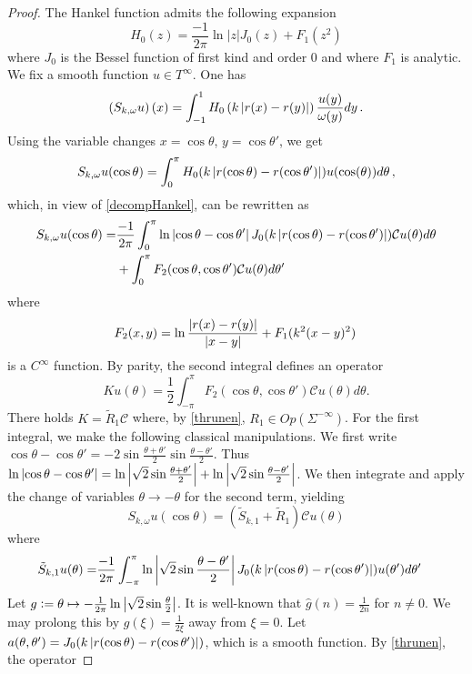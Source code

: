 \documentclass[a4paper]{article}
\begin{document}
\begin{proof}
	The Hankel function admits the following expansion
	\begin{equation}
	\label{decompHankel}
	H_0(z) = \frac{-1}{2\pi}\ln|z| J_0(z) + F_1(z^2)
	\end{equation}
	where $J_0$ is the Bessel function of first kind and order $0$ and where $F_1$ is analytic. We fix a smooth function $u \in T^{\infty}$. One has
	\[\left(S_{k,\omega} u\right)(x) = \int_{-1}^1 H_0\left(k\left\lvert r(x) - r(y) \right\rvert\right)\frac{u(y)}{\omega(y)}dy\,.\]
	Using the variable changes $x = \cos\theta$, $y = \cos \theta'$, we get 
	\[ S_{k,\omega} u(\cos \theta) = \int_{0}^\pi H_0(k \left\lvert r(\cos \theta) - r(\cos \theta') \right\rvert) u(\cos(\theta)) d\theta\,,\]
	which, in view of \eqref{decompHankel}, can be rewritten as
	\[\begin{split}
	S_{k,\omega} u(\cos \theta) = &\frac{-1}{2\pi}\int_{0}^\pi \ln \left\lvert \cos \theta - \cos \theta' \right\rvert J_0(k \left\lvert r(\cos \theta) - r(\cos \theta') \right\rvert)\mathcal{C}u(\theta) d\theta \\
	&+ \int_{0}^\pi F_2(\cos\theta,\cos\theta') \mathcal{C}u(\theta) d\theta'
	\end{split}\]
	where 
	\[F_2(x,y) = \ln \frac{\left\lvert r(x)-r(y) \right\rvert}{\left\lvert x-y \right\rvert} + F_1(k^2(x - y)^2)\,\]
	is a $C^\infty$ function. 
	By parity, the second integral defines an operator 
	\[Ku(\theta) = \frac{1}{2} \int_{-\pi}^{\pi} F_2(\cos\theta,\cos\theta') \mathcal{C}u(\theta) d\theta.\]
	There holds $K = \tilde{R}_1\mathcal{C}$ where, by \autoref{thrunen}, $R_1 \in \textit{Op}(\Sigma^{-\infty})$. For the first integral, we make the following classical manipulations. We first write $\cos \theta - \cos\theta' = - 2 \sin \frac{\theta + \theta'}{2}\sin \frac{\theta - \theta'}{2}$. Thus $\ln\left\lvert \cos \theta - \cos\theta' \right\rvert= \ln \left\lvert \sqrt{2} \sin \frac{\theta + \theta'}{2} \right\rvert + \ln \left\lvert \sqrt{2}\sin \frac{\theta - \theta'}{2} \right\rvert$. We then integrate and apply the change of variables $\theta \to - \theta$ for the second term, yielding
	\[S_{k,\omega}u(\cos\theta) = \left(\tilde{S}_{k,1} + \tilde{R}_1 \right)\mathcal{C}u(\theta)\]
	where
	\[\begin{split}
	\tilde{S}_{k,1}u(\theta) = &\frac{-1}{2\pi} \int_{-\pi}^\pi \ln \left\lvert \sqrt{2} \sin \frac{\theta - \theta'}{2} \right\rvert J_0(k\left\lvert r(\cos\theta) - r(\cos \theta') \right\rvert)u(\theta')d\theta'
	\end{split}\]
	Let $g \mathrel{\mathop:}= \theta \mapsto -\frac{1}{2\pi}\ln \left\lvert \sqrt{2} \sin \frac{\theta}{2} \right\rvert$. It is well-known that $\hat{g}(n) = \frac{1}{2n}$ for $n \neq 0$. We may prolong this by $g(\xi) = \frac{1}{2\xi}$ away from $\xi = 0$. Let $a(\theta,\theta') = J_0(k\left\lvert r(\cos \theta ) - r(\cos \theta') \right\rvert)$, which is a smooth function. By \autoref{thrunen}, the operator

\end{proof}
\end{document}
